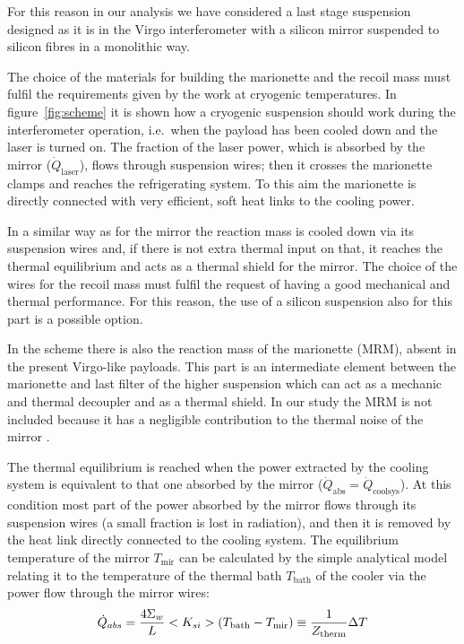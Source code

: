 For this reason in our analysis we have considered a last stage suspension designed as it is in the Virgo interferometer with a silicon mirror suspended to silicon fibres in a monolithic way.

The choice of the materials for building the marionette and the recoil mass must fulfil the requirements given by the work at cryogenic temperatures.
In figure~\ref{fig:scheme} it is shown how a cryogenic suspension should work during the interferometer operation, i.e.\ when the payload has been cooled down and the laser is turned on. The fraction of the laser power, which is  absorbed by the mirror ($\dot{Q}_\text{laser}$),  flows through suspension wires; then it  crosses the marionette clamps and reaches the refrigerating system. To this aim the marionette is directly connected with very efficient, soft heat links to the cooling power.

In a similar way as for the mirror the reaction mass is cooled down via its suspension wires and, if there is not extra thermal input on that, it reaches the thermal equilibrium and acts as a thermal shield for the mirror. The choice of the wires for the recoil mass must fulfil  the request of having a good mechanical and thermal performance. For this reason, the use of a silicon suspension also for this part is a possible option.

In the scheme there is also the reaction mass of the marionette (MRM), absent in the present Virgo-like payloads. This part is an intermediate element between the marionette and last filter of the higher suspension which can act as a mechanic and thermal decoupler and as a thermal shield.
In our study the MRM is not included because it has a negligible contribution to the thermal noise of the mirror \cite{PPP2009}.

The thermal equilibrium is reached when the power extracted by the cooling system is equivalent to that one absorbed by the mirror ($\dot{Q}_\text{abs}=\dot{Q}_\text{coolsys}$). At this condition most part of the power absorbed by the mirror flows through its suspension wires (a small fraction is lost in radiation), and then it is removed by the heat link directly connected to the cooling system.
The equilibrium temperature of the mirror $T_\text{mir}$ can be calculated by the simple analytical model relating it to the temperature of the thermal bath $T_\text{bath}$ of the cooler via the power  flow through the mirror wires:
\begin{equation}
\dot Q_{abs}=  \frac{{{4 \Sigma _w}}}{L}<K_{si}> ({T_\text{bath}} - {T_\text{mir}})\equiv\frac{1}{Z_\text{therm}}\Delta T \\
\label{eq1}
\end{equation}

